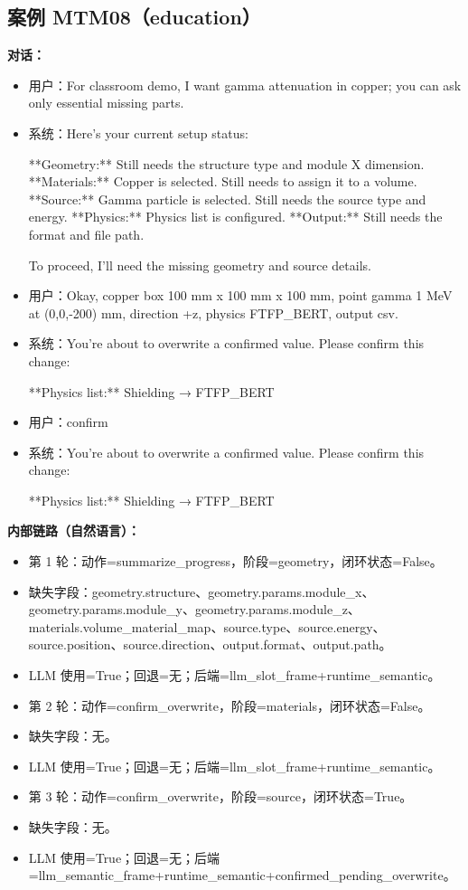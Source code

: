 \documentclass[11pt]{ctexart}
\begin{document}
\subsection{案例 MTM08（education）}
\textbf{对话：}
\begin{itemize}
\item 用户：For classroom demo, I want gamma attenuation in copper; you can ask only essential missing parts.
\item 系统：Here's your current setup status:

**Geometry:** Still needs the structure type and module X dimension.
**Materials:** Copper is selected. Still needs to assign it to a volume.
**Source:** Gamma particle is selected. Still needs the source type and energy.
**Physics:** Physics list is configured.
**Output:** Still needs the format and file path.

To proceed, I'll need the missing geometry and source details.
\item 用户：Okay, copper box 100 mm x 100 mm x 100 mm, point gamma 1 MeV at (0,0,-200) mm, direction +z, physics FTFP\_BERT, output csv.
\item 系统：You're about to overwrite a confirmed value. Please confirm this change:

**Physics list:** Shielding → FTFP\_BERT
\item 用户：confirm
\item 系统：You're about to overwrite a confirmed value. Please confirm this change:

**Physics list:** Shielding → FTFP\_BERT
\end{itemize}
\textbf{内部链路（自然语言）：}
\begin{itemize}
\item 第 1 轮：动作=summarize\_progress，阶段=geometry，闭环状态=False。
\item 缺失字段：geometry.structure、geometry.params.module\_x、geometry.params.module\_y、geometry.params.module\_z、materials.volume\_material\_map、source.type、source.energy、source.position、source.direction、output.format、output.path。
\item LLM 使用=True；回退=无；后端=llm\_slot\_frame+runtime\_semantic。
\item 第 2 轮：动作=confirm\_overwrite，阶段=materials，闭环状态=False。
\item 缺失字段：无。
\item LLM 使用=True；回退=无；后端=llm\_slot\_frame+runtime\_semantic。
\item 第 3 轮：动作=confirm\_overwrite，阶段=source，闭环状态=True。
\item 缺失字段：无。
\item LLM 使用=True；回退=无；后端=llm\_semantic\_frame+runtime\_semantic+confirmed\_pending\_overwrite。
\end{itemize}
\end{document}
